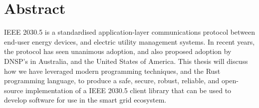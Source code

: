 \chapter*{Abstract}\label{abstract}
IEEE 2030.5 is a standardised application-layer communications protocol between end-user energy devices, and electric utility management systems. In recent years, the protocol has seen unanimous adoption, and also proposed adoption by DNSP's in Australia, and the United States of America.
This thesis will discuss how we have leveraged modern programming techniques, and the Rust programming language, to produce a safe, secure, robust, reliable, and open-source implementation of a IEEE 2030.5 client library that can be used to develop software for use in the smart grid ecosystem.
